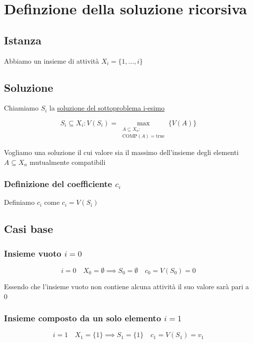 \newpage

\section{Definzione della soluzione ricorsiva}

\subsection{Istanza}
Abbiamo un insieme di attività $X_i = \{1, \dots, i\}$


\subsection{Soluzione}
Chiamiamo $S_i$ la \uline{soluzione del sottoproblema i-esimo}

{
    \large
    $$
        S_i \subseteq X_i :  
        V(S_i) = \max_{\substack{A \subseteq X_n : \\ \text{COMP}(A)=\text{true}}} \{ V(A) \}
    $$
}

Vogliamo una soluzione il cui valore sia il massimo dell'insieme degli elementi $A \subseteq X_n$ mutualmente compatibili


\subsubsection{Definizione del coefficiente $c_i$}
Definiamo $c_i$ come $c_i = V(S_i)$

\subsection{Casi base}

\subsubsection{Insieme vuoto $i=0$}
{
    \large
    $$
        i=0 \quad X_0 = \emptyset \implies S_0 = \emptyset \quad c_0=V(S_0)=0
    $$
}

Essendo che l'insieme vuoto non contiene alcuna attività il suo valore sarà pari a 0

\subsubsection{Insieme composto da un solo elemento $i=1$}
{
    \large
    $$
        i=1 \quad X_1=\{1\} \implies S_1 = \{1\} \quad c_1 = V(S_1) = v_1
    $$
}

